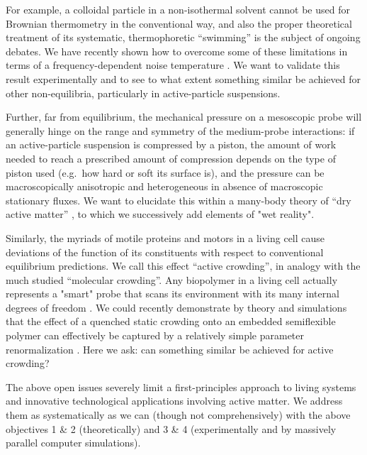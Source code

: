 \begin{workpackage}[id=WPactive,wphases=0-48,
  short=Active Particle Suspensions,%
  title=Probing Active Particle Suspensions with Colloids and Polymers,
  lead=Leipzig,
  LeipzigRM=12]
\begin{wpdescription}
For example, a colloidal particle in a non-isothermal solvent cannot be used for Brownian thermometry 
in the conventional way, and also the proper theoretical treatment of its systematic, thermophoretic 
``swimming'' is the subject of ongoing debates.
%
We have recently shown how to overcome some of these limitations in terms of a frequency-dependent noise 
temperature \cite{falasco-etal:2014}.
%
We want to validate this result experimentally and to see to what extent something similar be achieved for other 
non-equilibria, particularly in active-particle suspensions.

Further, far from equilibrium, the mechanical pressure on a mesoscopic probe will generally hinge on the range and 
symmetry of the medium-probe interactions: if an active-particle suspension is compressed by a piston, the
amount of work needed to reach a prescribed amount of compression depends on the type of
piston used (e.g.\ how hard or soft its surface is), and the pressure can be macroscopically
anisotropic and heterogeneous in absence of macroscopic stationary fluxes. 
%
We want to elucidate this within a many-body theory of ``dry active matter'' \cite{marchetti-etal:2013}, 
to which we successively add elements of "wet reality".

Similarly, the myriads of motile proteins and motors in a living cell cause deviations of the function
of its constituents with respect to conventional equilibrium predictions.  We call this
effect ``active crowding'', in analogy with the much studied ``molecular crowding''. 
%
Any biopolymer in a living cell actually represents a "smart" probe that scans its environment with its many internal degrees
of freedom \cite{otto-etal:2013}.
%
We could recently demonstrate by theory and simulations that the effect of a quenched static crowding onto an embedded
semiflexible polymer can effectively be captured by a relatively simple parameter renormalization \cite{schoebl-etal:2014}.  
%
Here we ask: can something similar be achieved for active crowding?

The above open issues severely limit a first-principles approach to living systems and
innovative technological applications involving active matter.
%
We address them as systematically as we can (though not comprehensively) with the above
objectives 1 \& 2 (theoretically) and 3 \& 4 (experimentally and by massively parallel
computer simulations).

\end{wpdescription}

\begin{tasklist}


\end{tasklist}
\end{workpackage}
